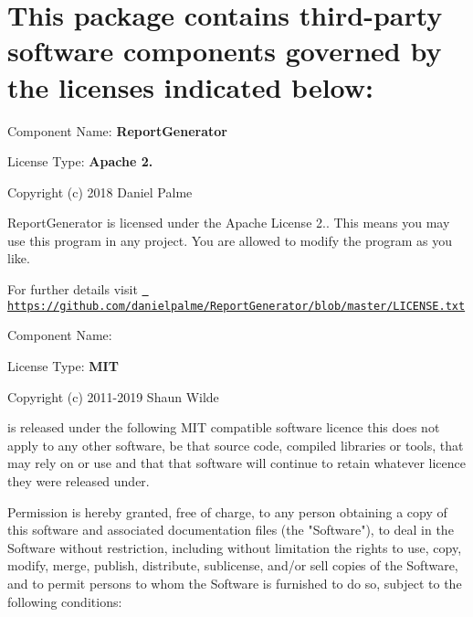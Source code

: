 \chapter{This package contains third-\/party software components governed by the licenses indicated below\+:}
\hypertarget{md__library_2_package_cache_2com_8unity_8testtools_8codecoverage_0d1_82_85_2_third_01_party_01_notices}{}\label{md__library_2_package_cache_2com_8unity_8testtools_8codecoverage_0d1_82_85_2_third_01_party_01_notices}
Component Name\+: {\bfseries{Report\+Generator}}

License Type\+: {\bfseries{Apache 2.}}

Copyright (c) 2018 Daniel Palme

Report\+Generator is licensed under the Apache License 2.. This means you may use this program in any project. You are allowed to modify the program as you like.

For further details visit \href{https://github.com/danielpalme/ReportGenerator/blob/master/LICENSE.txt}{\texttt{ https\+://github.\+com/danielpalme/\+Report\+Generator/blob/master/\+LICENSE.\+txt}}



Component Name\+: {\bfseries{}}

License Type\+: {\bfseries{MIT}}

Copyright (c) 2011-\/2019 Shaun Wilde

 is released under the following MIT compatible software licence this does not apply to any other software, be that source code, compiled libraries or tools, that  may rely on or use and that that software will continue to retain whatever licence they were released under.

Permission is hereby granted, free of charge, to any person obtaining a copy of this software and associated documentation files (the "{}\+Software"{}), to deal in the Software without restriction, including without limitation the rights to use, copy, modify, merge, publish, distribute, sublicense, and/or sell copies of the Software, and to permit persons to whom the Software is furnished to do so, subject to the following conditions\+:

